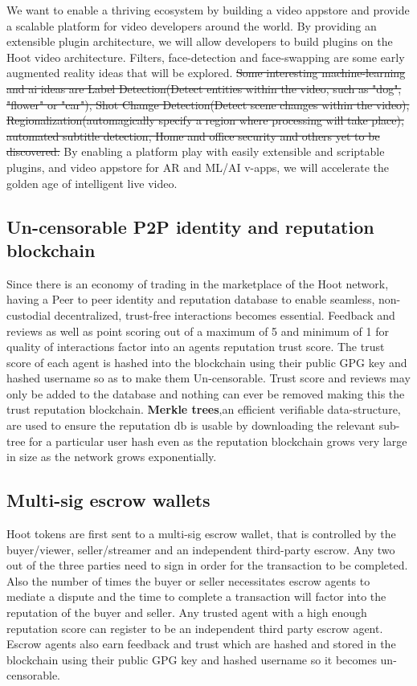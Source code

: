 \documentclass{article}
\begin{document}
 We want to enable a
thriving ecosystem by building a video appstore and provide a scalable
platform for video developers around the world. By providing an
extensible plugin architecture, we will allow developers to build
plugins on the Hoot video architecture. Filters, face-detection and face-swapping
are some early augmented reality ideas that will be explored. \sout{Some interesting
machine-learning and ai ideas are Label Detection(Detect entities
within the video, such as "dog", "flower" or "car"), Shot Change
Detection(Detect scene changes within the video),
Regionalization(automagically specify a region where processing will
take place), automated subtitle detection, Home and office security and others yet to be discovered.} By enabling a platform
play with easily extensible and scriptable plugins, and video appstore
for AR and ML/AI v-apps, we will accelerate the golden age of
intelligent live video.


\subsection{Un-censorable P2P identity and reputation blockchain}
Since there is an economy of trading in the marketplace of the Hoot network, having a Peer to peer
identity and reputation database to enable seamless, non-custodial
decentralized, trust-free interactions becomes essential. Feedback and reviews as well as point scoring out of a maximum of 5 and minimum of 1 for quality of interactions factor into an agents reputation trust score. The trust score of each agent is hashed into the blockchain using their public GPG key and hashed username so as to make them Un-censorable. Trust score and reviews may only be added to the database and nothing can ever be removed making this the trust reputation blockchain. \textbf{Merkle trees},an efficient verifiable data-structure, are used to ensure the reputation db is usable by downloading the relevant sub-tree for a particular user hash even as the reputation blockchain grows very large in size as the network grows exponentially.

\subsection{Multi-sig escrow wallets}
Hoot tokens are first sent to a multi-sig escrow wallet, that is controlled by the buyer/viewer, seller/streamer and an
independent third-party escrow. Any
two out of the three parties need to sign in order for the transaction to be
completed. Also the number of times the buyer or seller necessitates
escrow agents to mediate a dispute and the time to complete a
transaction will factor into the reputation of the buyer and
seller. Any trusted agent with a high enough reputation score can
register to be an independent third party escrow agent. Escrow agents
also earn feedback and trust which are hashed and stored in the
blockchain using their public GPG key and hashed username so it
becomes un-censorable.
\end{document}
